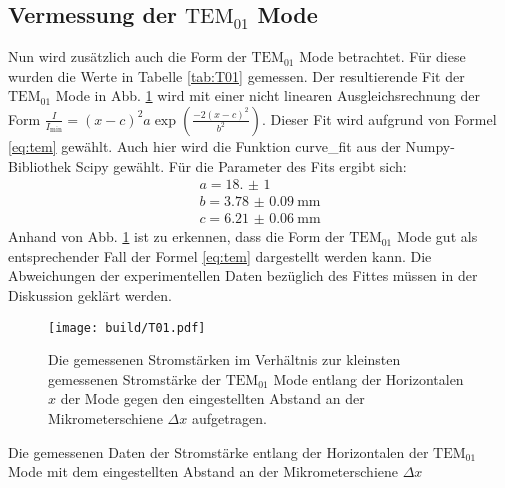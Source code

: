 \subsection{Vermessung der $\text{TEM}_{01}$ Mode}
Nun wird zusätzlich auch die Form der $\text{TEM}_\text{01}$ Mode betrachtet. Für diese wurden die Werte in Tabelle \ref{tab:T01} gemessen. 
Der resultierende Fit der $\text{TEM}_\text{01}$ Mode in Abb. \ref{fig:T01} wird mit einer nicht linearen Ausgleichsrechnung der Form $\frac{I}{I_\text{min}} =  (x-c)^2 a \exp \left( \frac{-2 (x-c)^2}{b^2}\right)$. Dieser Fit wird aufgrund von Formel \eqref{eq:tem} gewählt. Auch hier wird die Funktion curve\_fit aus der Numpy-Bibliothek Scipy \cite{scipy} gewählt. Für die Parameter des Fits ergibt sich:
\begin{gather*}
a = \num{18.(1)}\\
b = \SI{3.78(9)}{\milli\meter}\\
c = \SI{6.21(6)}{\milli\meter}
\end{gather*}
Anhand von Abb. \ref{fig:T01} ist zu erkennen, dass die Form der $\text{TEM}_\text{01}$ Mode gut als entsprechender Fall der Formel \eqref{eq:tem} dargestellt werden kann. Die Abweichungen der experimentellen Daten bezüglich des Fittes müssen in der Diskussion geklärt werden.

\begin{figure}
	\centering
	\texttt{[image: build/T01.pdf]}
	\caption{Die gemessenen Stromstärken im Verhältnis zur kleinsten gemessenen Stromstärke der $\text{TEM}_{01}$ Mode entlang der Horizontalen $x$ der Mode gegen den eingestellten Abstand an der Mikrometerschiene $\varDelta x$ aufgetragen.}
	\label{fig:T01}
\end{figure}

\begin{table}
	\centering
	\caption{Die gemessenen Daten der Stromstärke entlang der Horizontalen der $\text{TEM}_{\text{01}}$ Mode mit dem eingestellten Abstand an der Mikrometerschiene $\varDelta x$}
	
	
	\label{tab:T01}
\end{table}

